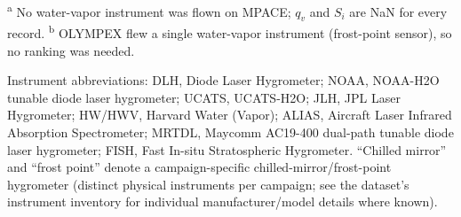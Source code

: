 \begin{table}[htbp]
  \vspace{0.5em}
  \begin{minipage}{\textwidth}
    \footnotesize
    \textsuperscript{a} No water-vapor instrument was flown on MPACE;
    $q_v$ and $S_i$ are NaN for every record. \quad
    \textsuperscript{b} OLYMPEX flew a single water-vapor instrument
    (frost-point sensor), so no ranking was needed.

    \vspace{0.3em}
    Instrument abbreviations: DLH, Diode Laser Hygrometer; NOAA, NOAA-H2O
    tunable diode laser hygrometer; UCATS, UCATS-H2O; JLH, JPL Laser
    Hygrometer; HW/HWV, Harvard Water (Vapor); ALIAS, Aircraft Laser
    Infrared Absorption Spectrometer; MRTDL, Maycomm AC19-400 dual-path
    tunable diode laser hygrometer; FISH, Fast In-situ Stratospheric
    Hygrometer. ``Chilled mirror'' and ``frost point'' denote a
    campaign-specific chilled-mirror/frost-point hygrometer (distinct
    physical instruments per campaign; see the dataset's instrument
    inventory for individual manufacturer/model details where known).
  \end{minipage}
\end{table}
